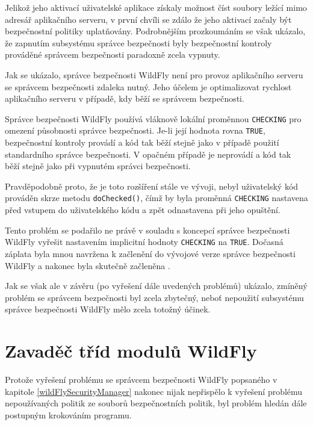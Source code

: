 Jelikož jeho aktivací uživatelské aplikace získaly možnost číst soubory ležící mimo adresář aplikačního serveru, v první chvíli se zdálo že jeho aktivací začaly být bezpečnostní politiky uplatňovány.
Podrobnějším prozkoumáním se však ukázalo, že zapnutím subsystému správce bezpečnosti byly bezpečnostní kontroly prováděné správcem bezpečnosti paradoxně zcela vypnuty.

Jak se ukázalo, správce bezpečnosti WildFly není pro provoz aplikačního serveru se správcem bezpečnosti zdaleka nutný.
Jeho účelem je optimalizovat rychlost aplikačního serveru v případě, kdy běží se správcem bezpečnosti.

Správce bezpečnosti WildFly používá vláknově lokální proměnnou {\tt CHECKING} pro omezení působnosti správce bezpečnosti.
Je-li její hodnota rovna {\tt TRUE}, bezpečnostní kontroly provádí a kód tak běží stejně jako v případě použití standardního správce bezpečnosti.
V opačném případě je neprovádí a kód tak běží stejně jako při vypnutém správci bezpečnosti. \cite{sourceWildFlySecurityManager}

Pravděpodobně proto, že je toto rozšíření stále ve vývoji, nebyl uživatelský kód prováděn skrze metodu {\tt doChecked()}, čímž by byla proměnná
{\tt CHECKING} nastavena před vstupem do uživatelského kódu a zpět odnastavena při jeho opuštění. \cite{sourceWildFlySecurityManager}

Tento problém se podařilo ne právě v souladu s koncepcí správce bezpečnosti WildFly vyřešit nastavením implicitní hodnoty {\tt CHECKING}
na {\tt TRUE}. Dočasná záplata byla mnou navržena k začlenění do vývojové verze správce bezpečnosti WildFly \cite{smPullRequest} a nakonec byla skutečně začleněna \cite{smPullRequestImpl}.

Jak se však ale v závěru (po vyřešení dále uvedených problémů) ukázalo, zmíněný problém se správcem bezpečnosti byl zcela zbytečný, neboť nepoužití subsystému správce bezpečnosti WildFly mělo zcela totožný účinek.

\section{Zavaděč tříd modulů WildFly} \label{moduleClassLoader}

Protože vyřešení problému se správcem bezpečnosti WildFly popsaného v kapitole \ref{wildFlySecurityManager} nakonec nijak nepřispělo k vyřešení problému
nepoužívaných politik ze souborů bezpečnostních politik, byl problém hledán dále postupným krokováním programu.

